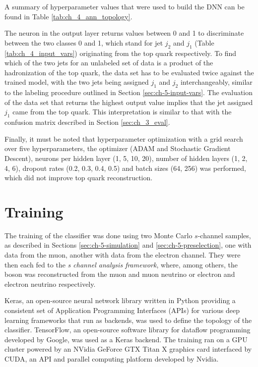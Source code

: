 A summary of hyperparameter values that were used to build the DNN can be found in Table \ref{tab:ch_4_ann_topology}.

The neuron in the output layer returns values between 0 and 1 to discriminate between the two classes 0 and 1, which stand for jet $j_2$ and $j_1$ (Table \ref{tab:ch_4_input_vars}) originating from the top quark respectively. To find which of the two jets for an unlabeled set of data is a product of the hadronization of the top quark, the data set has to be evaluated twice against the trained model, with the two jets being assigned $j_1$ and $j_2$ interchangeably, similar to the labeling procedure outlined in Section \ref{sec:ch-5-input-vars}. The evaluation of the data set that returns the highest output value implies that the jet assigned $j_1$ came from the top quark. This interpretation is similar to that with the confusion matrix described in Section \ref{sec:ch_3_eval}.

Finally, it must be noted that hyperparameter optimization with a grid search over five hyperparameters, the optimizer (ADAM and Stochastic Gradient Descent), neurons per hidden layer (1, 5, 10, 20), number of hidden layers (1, 2, 4, 6), dropout rates (0.2, 0.3, 0.4, 0.5) and batch sizes (64, 256) was performed, which did not improve top quark reconstruction.

\section{Training}
\label{sec:ch-5-training}
The training of the classifier was done using two Monte Carlo $s$-channel samples, as described in Sections \ref{sec:ch-5-simulation} and \ref{sec:ch-5-preselection}, one with data from the muon, another with data from the electron channel. They were then each fed to the \emph{s channel analysis framework}, where, among others, the \PWplus boson was reconstructed from the muon and muon neutrino or electron and electron neutrino respectively.

Keras, an open-source neural network library written in Python providing a consistent set of Application Programming Interfaces (APIs) for various deep learning frameworks that run as backends, was used to define the topology of the classifier. TensorFlow, an open-source software library for dataflow programming developed by Google, was used as a Keras backend. The training ran on a GPU cluster powered by an NVidia GeForce GTX Titan X \cite{misc:geforce} graphics card interfaced by CUDA, an API and parallel computing platform developed by Nvidia.

